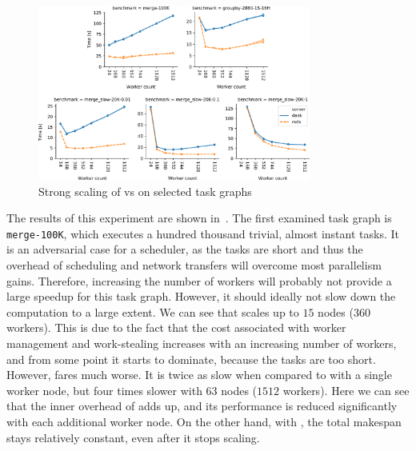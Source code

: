 \begin{figure}[h]
	\centering
	\includegraphics[width=0.8\textwidth]{./imgs/rsds/charts/rsds-dask-scaling}
	\caption{Strong scaling of \rsds{} vs \dask{} on selected task graphs}
	\label{fig:rsds-dask-scaling}
\end{figure}

The results of this experiment are shown in~. The first examined task
graph is \texttt{merge-100K}, which executes a hundred thousand trivial, almost instant
tasks. It is an adversarial case for a scheduler, as the tasks are short and thus the overhead of
scheduling and network transfers will overcome most parallelism gains. Therefore, increasing the
number of workers will probably not provide a large speedup for this task graph. However, it should
ideally not slow down the computation to a large extent. We can see that
\rsds{} scales up to $15$ nodes
($360$ workers). This is due to the fact that the cost associated with worker
management and work-stealing increases with an increasing number of workers, and from some point it
starts to dominate, because the tasks are too short. However, \dask{} fares
much worse. It is twice as slow when compared to \rsds{} with a single worker
node, but four times slower with $63$ nodes ($1512$
workers). Here we can see that the inner overhead of \dask{} adds up, and its
performance is reduced significantly with each additional worker node. On the other hand, with
\rsds{}, the total makespan stays relatively constant, even after it stops
scaling.

